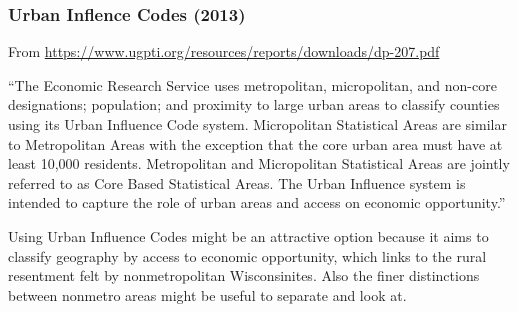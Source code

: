 \documentclass[10pt,]{article}
\begin{document}
\hypertarget{urban-inflence-codes-2013}{%
\subsubsection{Urban Inflence Codes
(2013)}\label{urban-inflence-codes-2013}}

From \url{https://www.ugpti.org/resources/reports/downloads/dp-207.pdf}

``The Economic Research Service uses metropolitan, micropolitan, and
non-core designations; population; and proximity to large urban areas to
classify counties using its Urban Influence Code system. Micropolitan
Statistical Areas are similar to Metropolitan Areas with the exception
that the core urban area must have at least 10,000 residents.
Metropolitan and Micropolitan Statistical Areas are jointly referred to
as Core Based Statistical Areas. The Urban Influence system is intended
to capture the role of urban areas and access on economic opportunity.''

Using Urban Influence Codes might be an attractive option because it
aims to classify geography by access to economic opportunity, which
links to the rural resentment felt by nonmetropolitan Wisconsinites.
Also the finer distinctions between nonmetro areas might be useful to
separate and look at.
\end{document}
